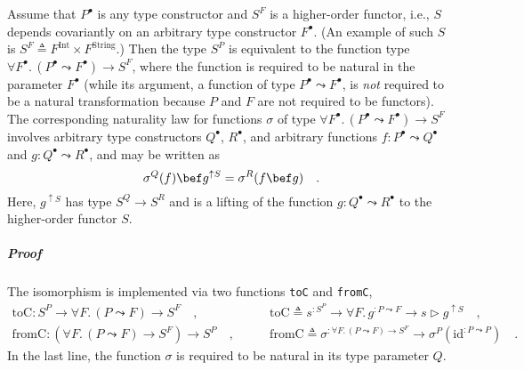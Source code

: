 Assume that $P^{\bullet}$ is any type constructor and $S^{F}$ is
a higher-order functor,
i.e., $S$ depends covariantly on an arbitrary type constructor $F^{\bullet}$.
(An example of such $S$ is $S^{F}\triangleq F^{\text{Int}}\times F^{\text{String}}$.)
Then the type $S^{P}$ is equivalent to the function type $\forall F^{\bullet}.\,(P^{\bullet}\leadsto F^{\bullet})\rightarrow S^{F}$,
where the function is required to be natural in the parameter $F^{\bullet}$
(while its argument, a function of type $P^{\bullet}\leadsto F^{\bullet}$,
is \emph{not} required to be a natural transformation because $P$
and $F$ are not required to be functors). The corresponding naturality
law for functions $\sigma$ of type $\forall F^{\bullet}.\,(P^{\bullet}\leadsto F^{\bullet})\rightarrow S^{F}$
involves arbitrary type constructors $Q^{\bullet}$, $R^{\bullet}$,
and arbitrary functions $f:P^{\bullet}\leadsto Q^{\bullet}$ and $g:Q^{\bullet}\leadsto R^{\bullet}$,
and may be written as
\begin{equation}
\sigma^{Q}(f)\bef g^{\uparrow S}=\sigma^{R}(f\bef g)\quad.\label{eq:assumed-naturality-of-argument-sigma}
\end{equation}
Here, $g^{\uparrow S}$ has type $S^{Q}\rightarrow S^{R}$ and is
a lifting of the function $g:Q^{\bullet}\leadsto R^{\bullet}$ to
the higher-order functor $S$.

\subparagraph{Proof}

The isomorphism is implemented via two functions \lstinline!toC!
and \lstinline!fromC!,
\begin{align*}
\text{toC}:S^{P}\rightarrow\forall F.\,(P\leadsto F)\rightarrow S^{F}\quad, & \quad\quad\text{toC}\triangleq s^{:S^{P}}\rightarrow\forall F.\,g^{:P\leadsto F}\rightarrow s\triangleright g^{\uparrow S}\quad,\\
\text{fromC}:(\forall F.\,(P\leadsto F)\rightarrow S^{F})\rightarrow S^{P}\quad, & \quad\quad\text{fromC}\triangleq\sigma^{:\forall F.\,(P\leadsto F)\rightarrow S^{F}}\rightarrow\sigma^{P}(\text{id}^{:P\leadsto P})\quad.
\end{align*}
In the last line, the function $\sigma$ is required to be natural
in its type parameter $Q$.

